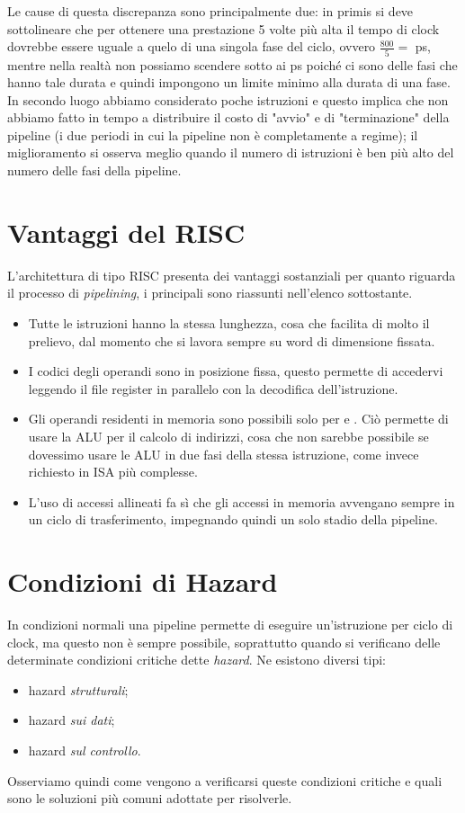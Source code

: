 \documentclass[class=book, crop=false, oneside]{standalone}
\begin{document}
Le cause di questa discrepanza sono principalmente due: in primis si deve sottolineare che per ottenere una prestazione 5 volte più alta il tempo di clock dovrebbe essere uguale a quelo di una singola fase del ciclo, ovvero \(\frac{800}{5}=\) \unit[160]{ps}, mentre nella realtà non possiamo scendere sotto ai \unit[200]{ps} poiché ci sono delle fasi che hanno tale durata e quindi impongono un limite minimo alla durata di una fase. In secondo luogo abbiamo considerato poche istruzioni e questo implica che non abbiamo fatto in tempo a distribuire il costo di "avvio" e di "terminazione" della pipeline (i due periodi in cui la pipeline non è completamente a regime); il miglioramento si osserva meglio quando il numero di istruzioni è ben più alto del numero delle fasi della pipeline.

\section{Vantaggi del RISC}
L'architettura di tipo RISC presenta dei vantaggi sostanziali per quanto riguarda il processo di \emph{pipelining}, i principali sono riassunti nell'elenco sottostante.
\begin{itemize}
	\item Tutte le istruzioni hanno la stessa lunghezza, cosa che facilita di molto il prelievo, dal momento che si lavora sempre su word di dimensione fissata.
	\item I codici degli operandi sono in posizione fissa, questo permette di accedervi leggendo il file register in parallelo con la decodifica dell’istruzione.
	\item Gli operandi residenti in memoria sono possibili solo per  e . Ciò permette di usare la ALU per il calcolo di indirizzi, cosa che non sarebbe possibile se dovessimo usare le ALU in due fasi della stessa istruzione, come invece richiesto in ISA più complesse.
	\item  L’uso di accessi allineati fa sì che gli accessi in memoria avvengano sempre in un ciclo di trasferimento, impegnando quindi un solo stadio della pipeline.
\end{itemize}

\section{Condizioni di Hazard}
In condizioni normali una pipeline permette di eseguire un'istruzione per ciclo di clock, ma questo non è sempre possibile, soprattutto quando si verificano delle determinate condizioni critiche dette \emph{hazard}. Ne esistono diversi tipi:
\begin{itemize}
	\item hazard \emph{strutturali};
	\item hazard \emph{sui dati};
	\item hazard \emph{sul controllo}.
\end{itemize}
Osserviamo quindi come vengono a verificarsi queste condizioni critiche e quali sono le soluzioni più comuni adottate per risolverle.
\end{document}
